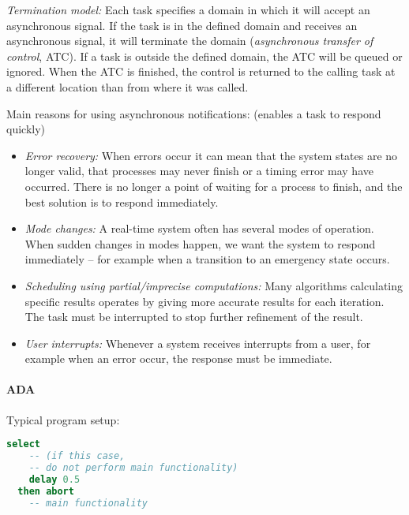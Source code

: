 \textit{Termination model:} Each task specifies a domain in which it will accept an asynchronous signal. If the task is in the defined domain and receives an asynchronous signal, it will terminate the domain (\textit{asynchronous transfer of control}, ATC). If a task is outside the defined domain, the ATC will be queued or ignored. When the ATC is finished, the control is returned to the calling task at a different location than from where it was called.

Main reasons for using asynchronous notifications: (enables a task to respond quickly)
\begin{itemize}
  \item \textit{Error recovery:} When errors occur it can mean that the system states are no longer valid, that processes may never finish or a timing error may have occurred. There is no longer a point of waiting for a process to finish, and the best solution is to respond immediately.
  \item \textit{Mode changes:} A real-time system often has several modes of operation. When sudden changes in modes happen, we want the system to respond immediately -- for example when a transition to an emergency state occurs.
  \item \textit{Scheduling using partial/imprecise computations:} Many algorithms calculating specific results operates by giving more accurate results for each iteration. The task must be interrupted to stop further refinement of the result.
  \item \textit{User interrupts:} Whenever a system receives interrupts from a user, for example when an error occur, the response must be immediate.
\end{itemize}

\paragraph{ADA}

Typical program setup:
\begin{lstlisting}[language=Ada]
  select
    -- (if this case,
    -- do not perform main functionality)
    delay 0.5
  then abort
    -- main functionality
\end{lstlisting}




